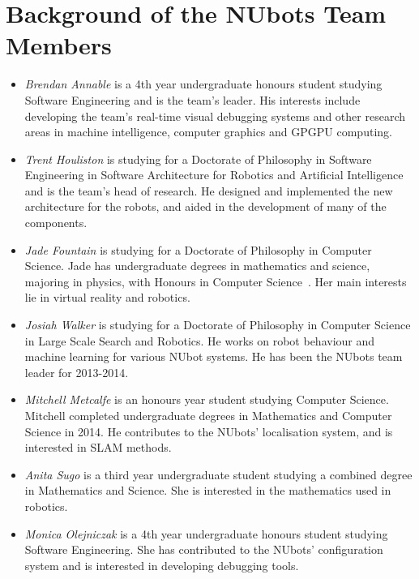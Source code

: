 \documentclass{llncs}
\begin{document}
\section{Background of the NUbots Team Members}
\begin{itemize}

\item \emph{Brendan Annable} is a 4th year undergraduate honours student studying Software Engineering and is the team's leader. His interests include developing the team's real-time visual debugging systems and other research areas in machine intelligence, computer graphics and GPGPU computing.

\item \emph{Trent Houliston} is studying for a Doctorate of Philosophy in Software Engineering in Software Architecture for Robotics and Artificial Intelligence and is the team's head of research. He designed and implemented the new architecture for the robots, and aided in the development of many of the components.

\item \emph{Jade Fountain} is studying for a Doctorate of Philosophy in Computer Science. Jade has undergraduate degrees in mathematics and science, majoring in physics, with Honours in Computer Science~\cite{fountain2015pointofregard}. Her main interests lie in virtual reality and robotics.

\item \emph{Josiah Walker} is studying for a Doctorate of Philosophy in Computer Science in Large Scale Search and Robotics. He works on robot behaviour and machine learning for various NUbot systems. He has been the NUbots team leader for 2013-2014.

\item \emph{Mitchell Metcalfe} is an honours year student studying Computer Science. Mitchell completed undergraduate degrees in Mathematics and Computer Science in 2014. He contributes to the NUbots' localisation system, and is interested in SLAM methods.

\item \emph{Anita Sugo} is a third year undergraduate student studying a combined degree in Mathematics and Science. She is interested in the mathematics used in robotics.

\item \emph{Monica Olejniczak} is a 4th year undergraduate honours student studying Software Engineering. She has contributed to the NUbots' configuration system and is interested in developing debugging tools.


\end{itemize}
\end{document}
